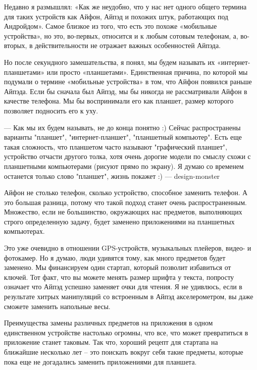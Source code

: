 \documentclass[ebook,12pt,oneside,openany]{memoir}
\begin{document}
\maketitle

Недавно я размышлял: «Как же неудобно, что у нас нет одного общего
термина для таких устройств как Айфон, Айпэд и похожих штук,
работающих под Андройдом». Самое близкое из того, что есть это похоже
«мобильные устройства», но это, во-первых, относится и к любым сотовым
телефонам, а, во-вторых, в действительности не отражает важных
особенностей Айпэда.

Но после секундного замешательства, я понял, мы будем называть их
«интернет-планшетами» или просто «планшетами». Единственная причина,
по которой мы подумали о термине «мобильные устройства» в том, что
Айфон появился раньше Айпэда. Если бы сначала был Айпэд, мы бы никогда
не рассматривали Айфон в качестве телефона. Мы бы воспринимали его как
планшет, размер которого позволяет подносить его к уху.

— Как мы их будем называть, не до конца понятно :) Сейчас
распространены варианты "планшет", "интернет-планшет", "планшетный
компьютер". Есть еще такая сложность, что планшетом часто называют
"графический планшет", устройство отчасти другого толка, хотя очень
дорогие модели по смыслу схожи с планшетными компьютерами (рисуют
прямо по экрану). Я думаю со временем останется только слово
"планшет", жизнь покажет :) — design-monster

Айфон не столько телефон, сколько устройство, способное заменить
телефон. А это большая разница, потому что такой подход станет очень
распространенным. Множество, если не большинство, окружающих нас
предметов, выполняющих строго определенную задачу, будет заменено
приложениями на планшетных компьютерах.

Это уже очевидно в отношении GPS-устройств, музыкальных плейеров,
видео- и фотокамер. Но я думаю, люди удивятся тому, как много
предметов будет заменено. Мы финансируем один стартап, который
позволит избавиться от ключей. Тот факт, что вы можете менять размер
шрифта у текста, попросту означает что Айпэд успешно заменяет очки для
чтения. Я не удивлюсь, если в результате хитрых манипуляций со
встроенным в Айпэд акселерометром, вы даже сможете заменить напольные
весы.

Преимущества замены различных предметов на приложения в одном
единственном устройстве настолько огромны, что все, что может
превратиться в приложение станет таковым. Так что, хороший рецепт для
стартапа на ближайшие несколько лет – это поискать вокруг себя такие
предметы, которые пока еще не догадались заменить приложениями для
планшета.
\end{document}
